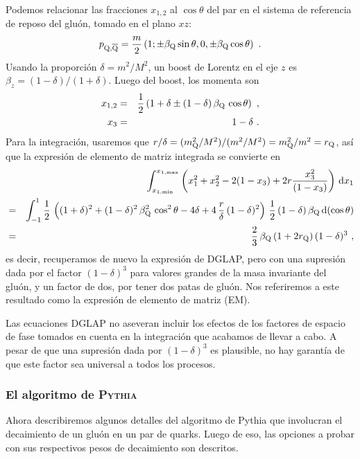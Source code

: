 \documentclass[a4paper,12pt]{article}
\begin{document}
Podemos relacionar las fracciones $x_{1,2}$ al $\cos\theta$ del par en el sistema de referencia de reposo del gluón, tomado en el plano $xz$:
\begin{equation}
p_{{\mathrm Q},\overline{\mathrm Q}} = \frac{m}{2} \left( 1; \pm \beta_{{\mathrm Q}} \sin\theta, 0, 
 \pm \beta_{{\mathrm Q}} \cos\theta \right) ~.
\label{kinp}
\end{equation}
Usando la proporción $\delta=m^2/M^2$, un boost de Lorentz en el eje $z$ es $\beta_z=(1-\delta)/(1+\delta)$. Luego del boost, los momenta son
\begin{eqnarray}
x_{1,2} & = & \frac{1}{2} \left(1 + \delta \pm (1 - \delta)
\, \beta_{{\mathrm Q}} \, \cos\theta \right) ~, \label{kinx} \\
x_3 & = & 1 - \delta ~.
\end{eqnarray}
Para la integración, usaremos que $r/\delta=(m_{\mathrm Q}^2/M^2)/(m^2/M^2)=m_{\mathrm Q}^2/m^2=r_{\mathrm Q}$, así que la expresión de elemento de matriz integrada se convierte en
\begin{eqnarray}
 &  & \int_{x_{1,\mathrm{min}}}^{x_{1,\mathrm{max}}} \left( x_1^2 + x_2^2 - 2(1 - x_3) 
+ 2r \frac{x_3^2}{(1 - x_3)} \right)  \, {\mathrm d} x_1 \nonumber \\
& = & \int_{-1}^1 \frac{1}{2} \, \left( (1 + \delta)^2 
+ (1 - \delta)^2 \, \beta_{{\mathrm Q}}^2 \, \cos^2\theta - 4 \delta 
+ 4 \, \frac{r}{\delta} \, (1 - \delta)^2 \right) \, \frac{1}{2} 
\, (1 - \delta) \, \beta_{{\mathrm Q}} \, {\mathrm d}(\cos\theta) \nonumber \\
& = & \frac{2}{3} \, \beta_{{\mathrm Q}} \, (1 + 2 r_{{\mathrm Q}}) \, (1 - \delta)^3 ~, 
\label{m2ME} 
\end{eqnarray}
es decir, recuperamos de nuevo la expresión de DGLAP, pero con una supresión dada por el factor $(1-\delta)^3$ para valores grandes de la masa invariante del gluón, y un factor de dos, por tener dos patas de gluón. Nos referiremos a este resultado como la expresión de elemento de matriz (EM).

Las ecuaciones DGLAP no aseveran incluir los efectos de los factores de espacio de fase tomados en cuenta en la integración que acabamos de llevar a cabo. A pesar de que una supresión dada por $(1-\delta)^3$ es plausible, no hay garantía de que este factor sea universal a todos los procesos.

\subsubsection{El algoritmo de \textsc{Pythia}}
\label{subsubsec:PythiaAlg}

Ahora describiremos algunos detalles del algoritmo de Pythia que involucran el decaimiento de un gluón en un par de quarks. Luego de eso, las opciones a probar con sus respectivos pesos de decaimiento son descritos.
\end{document}
